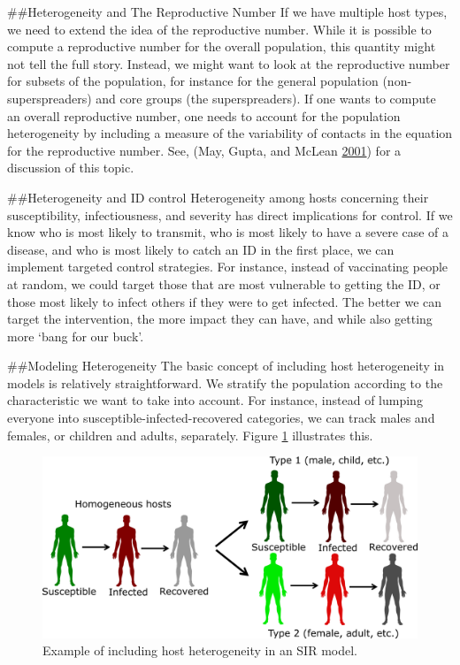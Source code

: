 \documentclass[]{book}
\theoremstyle{definition}
\theoremstyle{definition}
\theoremstyle{definition}
\theoremstyle{remark}
\begin{document}
\#\#Heterogeneity and The Reproductive Number If we have multiple host
types, we need to extend the idea of the reproductive number. While it
is possible to compute a reproductive number for the overall population,
this quantity might not tell the full story. Instead, we might want to
look at the reproductive number for subsets of the population, for
instance for the general population (non-superspreaders) and core groups
(the superspreaders). If one wants to compute an overall reproductive
number, one needs to account for the population heterogeneity by
including a measure of the variability of contacts in the equation for
the reproductive number. See, (May, Gupta, and McLean
\protect\hyperlink{ref-may01}{2001}) for a discussion of this topic.

\#\#Heterogeneity and ID control Heterogeneity among hosts concerning
their susceptibility, infectiousness, and severity has direct
implications for control. If we know who is most likely to transmit, who
is most likely to have a severe case of a disease, and who is most
likely to catch an ID in the first place, we can implement targeted
control strategies. For instance, instead of vaccinating people at
random, we could target those that are most vulnerable to getting the
ID, or those most likely to infect others if they were to get infected.
The better we can target the intervention, the more impact they can
have, and while also getting more `bang for our buck'.

\#\#Modeling Heterogeneity The basic concept of including host
heterogeneity in models is relatively straightforward. We stratify the
population according to the characteristic we want to take into account.
For instance, instead of lumping everyone into
susceptible-infected-recovered categories, we can track males and
females, or children and adults, separately. Figure
\ref{fig:heterogeneity} illustrates this.

\begin{figure}
\centering
\includegraphics{./images/heterogeneityexample.png}
\caption{\label{fig:heterogeneity}Example of including host heterogeneity in
an SIR model.}
\end{figure}
\end{document}
